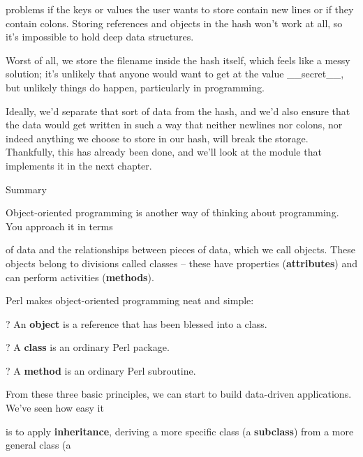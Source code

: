 \documentclass[a4paper,11pt]{book}
\begin{document}
\noindent problems if the keys or values the user wants to store contain new lines or if they contain colons. Storing references and objects in the hash won't work at all, so it's impossible to hold deep data structures.

\noindent Worst of all, we store the filename inside the hash itself, which feels like a messy solution; it's unlikely that anyone would want to get at the value \_\_secret\_\_, but unlikely things do happen, particularly in programming.

\noindent 

\noindent Ideally, we'd separate that sort of data from the hash, and we'd also ensure that the data would get written in such a way that neither newlines nor colons, nor indeed anything we choose to store in our hash, will break the storage. Thankfully, this has already been done, and we'll look at the module that implements it in the next chapter.

\noindent 

\noindent 

\noindent Summary

\noindent 

\noindent Object-oriented programming is another way of thinking about programming. You approach it in terms

\noindent of data and the relationships between pieces of data, which we call objects. These objects belong to divisions called classes -- these have properties (\textbf{attributes}) and can perform activities (\textbf{methods}).

\noindent 

\noindent Perl makes object-oriented programming neat and simple:

\noindent 

\noindent ? An \textbf{object }is a reference that has been blessed into a class.

\noindent 

\noindent ? A \textbf{class }is an ordinary Perl package.

\noindent 

\noindent ? A \textbf{method }is an ordinary Perl subroutine.

\noindent 

\noindent From these three basic principles, we can start to build data-driven applications. We've seen how easy it

\noindent is to apply \textbf{inheritance}, deriving a more specific class (a \textbf{subclass}) from a more general class (a
\end{document}

